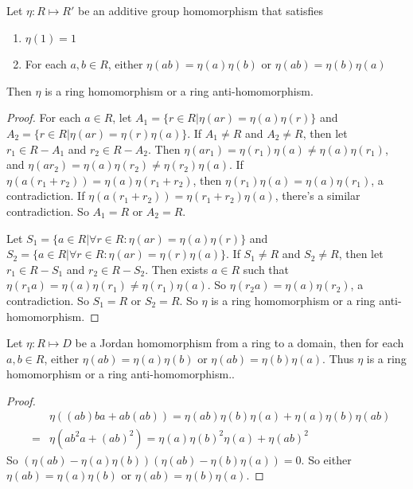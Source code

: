 \documentclass[12pt]{book}
\begin{document}
\begin{lemma}[Hua]
	Let $\eta: R\mapsto R'$ be an additive group homomorphism that satisfies
	\begin{enumerate}
		\item $\eta(1)=1$
		\item For each $a,b\in R$, either $\eta(ab)=\eta(a)\eta(b)$ or $\eta(ab)=\eta(b)\eta(a)$
	\end{enumerate}
	Then $\eta$ is a ring homomorphism or a ring anti-homomorphism.
\end{lemma}
\begin{proof}
	For each $a\in R$, let $A_1=\{r\in R|\eta(ar)=\eta(a)\eta(r)\}$ and $A_2=\{r\in R|\eta(ar)=\eta(r)\eta(a)\}$. If $A_1\neq R$ and $A_2\neq R$, then let $r_1\in R-A_1$ and $r_2\in R-A_2$. Then $\eta(ar_1)=\eta(r_1)\eta(a)\neq\eta(a)\eta(r_1)$, and $\eta(ar_2)=\eta(a)\eta(r_2)\neq\eta(r_2)\eta(a)$. If $\eta(a(r_1+r_2))=\eta(a)\eta(r_1+r_2)$, then $\eta(r_1)\eta(a)=\eta(a)\eta(r_1)$, a contradiction. If $\eta(a(r_1+r_2))=\eta(r_1+r_2)\eta(a)$, there's a similar contradiction. So $A_1= R$ or $A_2= R$.
	
	Let $S_1=\{a\in R|\forall r\in R:\eta(ar)=\eta(a)\eta(r)\}$ and $S_2=\{a\in R|\forall r\in R:\eta(ar)=\eta(r)\eta(a)\}$. If $S_1\neq R$ and $S_2\neq R$, then let $r_1\in R-S_1$ and $r_2\in R-S_2$. Then exists $a\in R$ such that $\eta(r_1a)=\eta(a)\eta(r_1)\neq\eta(r_1)\eta(a)$. So $\eta(r_2a)=\eta(a)\eta(r_2)$, a contradiction. So $S_1= R$ or $S_2= R$. So $\eta$ is a ring homomorphism or a ring anti-homomorphism.
\end{proof}

\begin{lemma}
	Let $\eta: R\mapsto D$ be a Jordan homomorphism from a ring to a domain, then for each $a,b\in R$, either $\eta(ab)=\eta(a)\eta(b)$ or $\eta(ab)=\eta(b)\eta(a)$. Thus $\eta$ is a ring homomorphism or a ring anti-homomorphism..
\end{lemma}
\begin{proof}
	\begin{eqnarray}
		&&\eta((ab)ba+ab(ab))=\eta(ab)\eta(b)\eta(a)+\eta(a)\eta(b)\eta(ab)\nonumber\\
		&=&\eta(ab^2a+(ab)^2)=\eta(a)\eta(b)^2\eta(a)+\eta(ab)^2
	\end{eqnarray}
	So $(\eta(ab)-\eta(a)\eta(b))(\eta(ab)-\eta(b)\eta(a))=0$. So either $\eta(ab)=\eta(a)\eta(b)$ or $\eta(ab)=\eta(b)\eta(a)$.
\end{proof}
\end{document}
